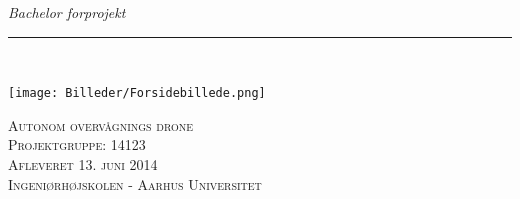 \thispagestyle{empty}
\begin{flushright}
\vspace{3cm}

\phantom{hul}

\phantom{hul}

\phantom{hul}

\textsl{\Huge Bachelor forprojekt} \\ \vspace{1cm}

\rule{13cm}{3mm} \\ \vspace{1.5cm}
\vspace{1cm}

\texttt{[image: Billeder/Forsidebillede.png]}

\vspace{4cm} 
\textsc{\Large Autonom overvågnings drone  \\
Projektgruppe: 14123 \\
Afleveret 13. juni 2014\\
Ingeniørhøjskolen - Aarhus Universitet\\}
\end{flushright}
